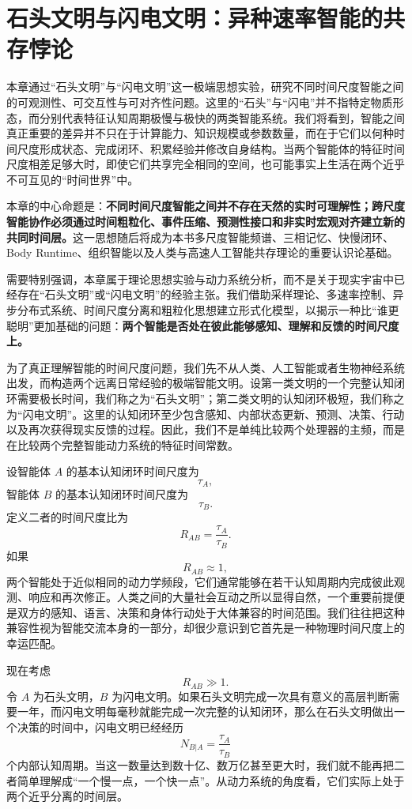\chapter{石头文明与闪电文明：异种速率智能的共存悖论}

\begin{chapterlead}
本章通过“石头文明”与“闪电文明”这一极端思想实验，研究不同时间尺度智能之间的可观测性、可交互性与可对齐性问题。这里的“石头”与“闪电”并不指特定物质形态，而分别代表特征认知周期极慢与极快的两类智能系统。我们将看到，智能之间真正重要的差异并不只在于计算能力、知识规模或参数数量，而在于它们以何种时间尺度形成状态、完成闭环、积累经验并修改自身结构。当两个智能体的特征时间尺度相差足够大时，即使它们共享完全相同的空间，也可能事实上生活在两个近乎不可互见的“时间世界”中。

本章的中心命题是：\textbf{不同时间尺度智能之间并不存在天然的实时可理解性；跨尺度智能协作必须通过时间粗粒化、事件压缩、预测性接口和非实时宏观对齐建立新的共同时间层。}这一思想随后将成为本书多尺度智能频谱、三相记忆、快慢闭环、Body Runtime、组织智能以及人类与高速人工智能共存理论的重要认识论基础。

需要特别强调，本章属于理论思想实验与动力系统分析，而不是关于现实宇宙中已经存在“石头文明”或“闪电文明”的经验主张。我们借助采样理论、多速率控制、异步分布式系统、时间尺度分离和粗粒化思想建立形式化模型，以揭示一种比“谁更聪明”更加基础的问题：\textbf{两个智能是否处在彼此能够感知、理解和反馈的时间尺度上。}
\end{chapterlead}


为了真正理解智能的时间尺度问题，我们先不从人类、人工智能或者生物神经系统出发，而构造两个远离日常经验的极端智能文明。设第一类文明的一个完整认知闭环需要极长时间，我们称之为“石头文明”；第二类文明的认知闭环极短，我们称之为“闪电文明”。这里的认知闭环至少包含感知、内部状态更新、预测、决策、行动以及再次获得现实反馈的过程。因此，我们不是单纯比较两个处理器的主频，而是在比较两个完整智能动力系统的特征时间常数。

设智能体 $A$ 的基本认知闭环时间尺度为
\[
\tau_A,
\]
智能体 $B$ 的基本认知闭环时间尺度为
\[
\tau_B.
\]
定义二者的时间尺度比为
\[
R_{AB}=\frac{\tau_A}{\tau_B}.
\]
如果
\[
R_{AB}\approx 1,
\]
两个智能处于近似相同的动力学频段，它们通常能够在若干认知周期内完成彼此观测、响应和再次修正。人类之间的大量社会互动之所以显得自然，一个重要前提便是双方的感知、语言、决策和身体行动处于大体兼容的时间范围。我们往往把这种兼容性视为智能交流本身的一部分，却很少意识到它首先是一种物理时间尺度上的幸运匹配。

现在考虑
\[
R_{AB}\gg 1.
\]
令 $A$ 为石头文明，$B$ 为闪电文明。如果石头文明完成一次具有意义的高层判断需要一年，而闪电文明每毫秒就能完成一次完整的认知闭环，那么在石头文明做出一个决策的时间中，闪电文明已经经历
\[
N_{B|A}
=
\frac{\tau_A}{\tau_B}
\]
个内部认知周期。当这一数量达到数十亿、数万亿甚至更大时，我们就不能再把二者简单理解成“一个慢一点，一个快一点”。从动力系统的角度看，它们实际上处于两个近乎分离的时间层。

